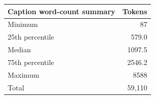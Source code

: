 \begin{tabular}{@{}lr@{}}
\toprule
Caption word-count summary & Tokens \\
\midrule
Minimum & 87 \\
25th percentile & 579.0 \\
Median & 1097.5 \\
75th percentile & 2546.2 \\
Maximum & 8588 \\
Total & 59,110 \\
\bottomrule
\end{tabular}
